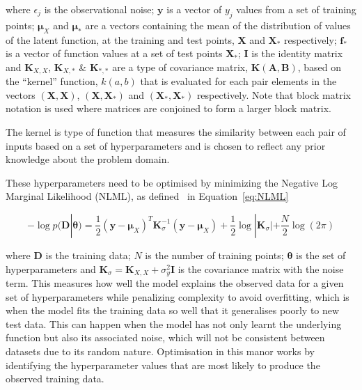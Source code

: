 \documentclass[12pt]{article}
\begin{document}
    \noindent where $\epsilon_j$ is the observational noise; $\mathbf{y}$ is a vector of $y_j$ values from a set of training points; $\boldsymbol{\mu}_X$ and $\boldsymbol{\mu}_*$ are a vectors containing the mean of the distribution of values of the latent function, at the training and test points, $\mathbf{X}$ and  $\mathbf{X}_*$ respectively; $\mathbf{f}_*$ is a vector of function values at a set of test points $\mathbf{X}_*$; $\mathbf{I}$ is the identity matrix and $\mathbf{K}_{X,X}$, $\mathbf{K}_{X,*}$ \& $\mathbf{K}_{*,*}$ are a type of covariance matrix, $\mathbf{K}(\mathbf{A},\mathbf{B})$, based on the ``kernel'' function, $k(a,b)$ that is evaluated for each pair elements in the vectors $(\mathbf{X},\mathbf{X})$, $(\mathbf{X},\mathbf{X}_*)$ and $(\mathbf{X}_*,\mathbf{X}_*)$ respectively.
    Note that block matrix notation is used where matrices are conjoined to form a larger block matrix.

    The kernel is type of function that measures the similarity between each pair of inputs based on a set of hyperparameters and is chosen to reflect any prior knowledge about the problem domain.

    These hyperparameters need to be optimised by minimizing the Negative Log Marginal Likelihood (NLML), as defined~\cite{murphy2023probabilistic} in Equation~\ref{eq:NLML}

    \begin{equation}
        -\log p(\mathbf{D}|\boldsymbol{\theta}) = \frac{1}{2} (\mathbf{y} - \boldsymbol{\mu}_X)^T \mathbf{K}_{\sigma}^{-1} (\mathbf{y} - \boldsymbol{\mu}_X) + \frac{1}{2} \log |\mathbf{K}_{\sigma}| + \frac{N}{2} \log(2\pi)\label{eq:NLML}
    \end{equation}


    \noindent where $\mathbf{D}$ is the training data; $N$ is the number of training points; $\boldsymbol{\theta}$ is the set of hyperparameters and $\mathbf{K}_{\sigma} = \mathbf{K}_{X,X} + \sigma^2_y \mathbf{I}$ is the covariance matrix with the noise term.
    This measures how well the model explains the observed data for a given set of hyperparameters while penalizing complexity to avoid overfitting, which is when the model fits the training data so well that it generalises poorly to new test data.
    This can happen when the model has not only learnt the underlying function but also its associated noise, which will not be consistent between datasets due to its random nature.
    Optimisation in this manor works by identifying the hyperparameter values that are most likely to produce the observed training data.
\end{document}
